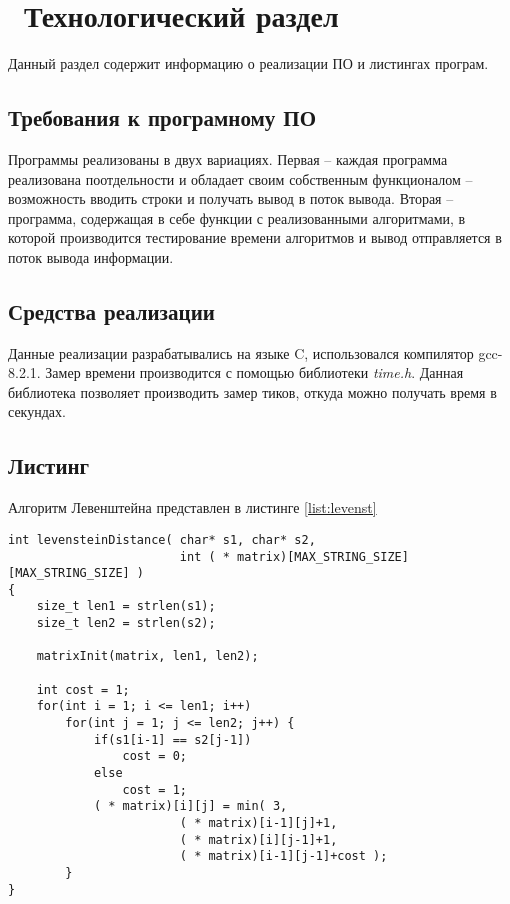\chapter{ Технологический раздел}
\label{cha:impl}

Данный раздел содержит информацию о реализации ПО и листингах програм.

\section{ Требования к програмному ПО}
Программы реализованы в двух вариациях. Первая -- каждая программа реализована поотдельности и обладает своим собственным функционалом -- возможность вводить строки и получать вывод в поток вывода. Вторая -- программа, содержащая в себе функции с реализованными алгоритмами, в которой производится тестирование времени алгоритмов и вывод отправляется в поток вывода информации.

\section{ Средства реализации }
Данные реализации разрабатывались на языке C, использовался компилятор gcc-8.2.1.
Замер времени производится с помощью библиотеки \textit{time.h}. Данная библиотека позволяет производить замер тиков, откуда можно получать время в секундах. 

\section{ Листинг}
Алгоритм Левенштейна представлен в листинге \ref{list:levenst}
\begin{lstlisting}[style=CStyle, caption={Levenstein algorithm},
                    label={list:levenst}]
int levensteinDistance( char* s1, char* s2,
                        int ( * matrix)[MAX_STRING_SIZE][MAX_STRING_SIZE] )
{
    size_t len1 = strlen(s1);
    size_t len2 = strlen(s2);

    matrixInit(matrix, len1, len2);

    int cost = 1;
    for(int i = 1; i <= len1; i++)
        for(int j = 1; j <= len2; j++) {
            if(s1[i-1] == s2[j-1])
                cost = 0;
            else
                cost = 1;
            ( * matrix)[i][j] = min( 3,
                        ( * matrix)[i-1][j]+1,
                        ( * matrix)[i][j-1]+1,
                        ( * matrix)[i-1][j-1]+cost );
        }
}
\end{lstlisting}

